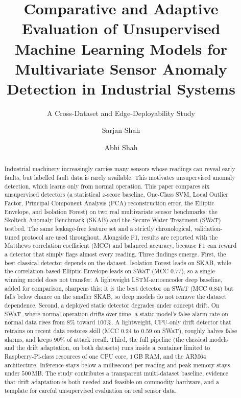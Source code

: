 \documentclass[runningheads]{llncs}
\begin{document}
\title{Comparative and Adaptive Evaluation of Unsupervised Machine Learning
Models for Multivariate Sensor Anomaly Detection in Industrial Systems}
\subtitle{A Cross-Dataset and Edge-Deployability Study}

\author{Sarjan Shah \and Abhi Shah}

\maketitle

\begin{abstract}
Industrial machinery increasingly carries many sensors whose readings can reveal
early faults, but labelled fault data is rarely available. This motivates
unsupervised anomaly detection, which learns only from normal operation. This
paper compares six unsupervised detectors (a statistical $z$-score baseline,
One-Class SVM, Local Outlier Factor, Principal Component Analysis (PCA)
reconstruction error, the Elliptic Envelope, and Isolation Forest) on two real
multivariate sensor benchmarks: the Skoltech Anomaly Benchmark (SKAB) and the
Secure Water Treatment (SWaT) testbed. The same leakage-free feature set and a
strictly chronological, validation-tuned protocol are used throughout. Alongside
F1, results are reported with the Matthews correlation coefficient (MCC) and
balanced accuracy, because F1 can reward a detector that simply flags almost
every reading. Three findings emerge. First, the best classical detector depends
on the dataset. Isolation Forest leads on SKAB, while the correlation-based
Elliptic Envelope leads on SWaT (MCC $0.77$), so a single winning model does not
transfer. A lightweight LSTM-autoencoder deep baseline, added for comparison,
sharpens this: it is the best detector on SWaT (MCC $0.84$) but falls below
chance on the smaller SKAB, so deep models do not remove the dataset dependence.
Second, a deployed static detector degrades under concept drift. On
SWaT, where normal operation drifts over time, a static model's false-alarm rate
on normal data rises from $8\%$ toward $100\%$. A lightweight, CPU-only drift
detector that retrains on recent data restores skill (MCC $0.24$ to $0.59$ on
SWaT), roughly halves false alarms, and keeps $90\%$ of attack recall. Third, the
full pipeline (the classical models and the drift adaptation, on both datasets)
runs
inside a container limited to Raspberry-Pi-class resources of one CPU core,
$1$\,GB RAM, and the ARM64 architecture. Inference stays below a millisecond per
reading and peak memory stays under $500$\,MB. The study contributes a
transparent multi-dataset baseline, evidence that drift adaptation is both needed
and feasible on commodity hardware, and a template for careful unsupervised
evaluation on real sensor data.


\end{abstract}
\end{document}
